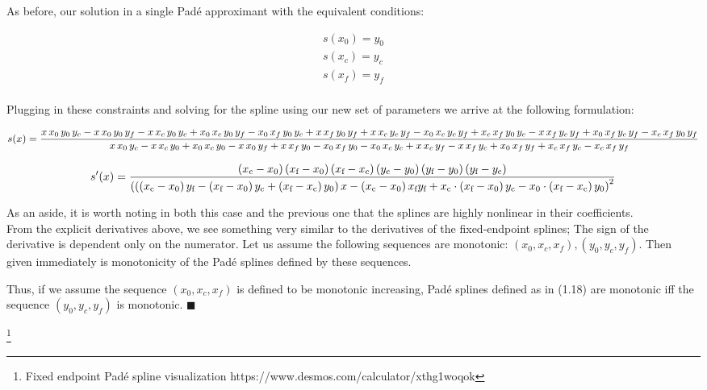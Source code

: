 \documentclass{article}
\begin{document}
		As before, our solution in a single Pad\'{e} approximant with the equivalent conditions: 
	
	\begin{align}
		s(x_0) = y_0 \\
		s(x_c) = y_c \\
		s(x_f) = y_f \\ 
	\end{align}
	
	Plugging in these constraints and solving for the spline using our new set of parameters we arrive at the following formulation:
	
	
	\tiny
	\[
	\hss
	s(x) = \frac{x\,x_{0}\,y_{0}\,y_{c}-x\,x_{0}\,y_{0}\,y_{f}-x\,x_{c}\,y_{0}\,y_{c}+x_{0}\,x_{c}\,y_{0}\,y_{f}-x_{0}\,x_{f}\,y_{0}\,y_{c}+x\,x_{f}\,y_{0}\,y_{f}+x\,x_{c}\,y_{c}\,y_{f}-x_{0}\,x_{c}\,y_{c}\,y_{f}+x_{c}\,x_{f}\,y_{0}\,y_{c}-x\,x_{f}\,y_{c}\,y_{f}+x_{0}\,x_{f}\,y_{c}\,y_{f}-x_{c}\,x_{f}\,y_{0}\,y_{f}}{x\,x_{0}\,y_{c}-x\,x_{c}\,y_{0}+x_{0}\,x_{c}\,y_{0}-x\,x_{0}\,y_{f}+x\,x_{f}\,y_{0}-x_{0}\,x_{f}\,y_{0}-x_{0}\,x_{c}\,y_{c}+x\,x_{c}\,y_{f}-x\,x_{f}\,y_{c}+x_{0}\,x_{f}\,y_{f}+x_{c}\,x_{f}\,y_{c}-x_{c}\,x_{f}\,y_{f}}
	\hss
	\]
	
	\[
	\hss
	s'(x) = \frac{\left(x_\text{c}-x_0\right)\left(x_\text{f}-x_0\right)\left(x_\text{f}-x_\text{c}\right)\left(y_\text{c}-y_0\right)\left(y_\text{f}-y_0\right)\left(y_\text{f}-y_\text{c}\right)}{\left(\left(\left(x_\text{c}-x_0\right)y_\text{f}-\left(x_\text{f}-x_0\right)y_\text{c}+\left(x_\text{f}-x_\text{c}\right)y_0\right)x-\left(x_\text{c}-x_0\right)x_\text{f}y_\text{f}+x_\text{c}\cdot\left(x_\text{f}-x_0\right)y_\text{c}-x_0\cdot\left(x_\text{f}-x_\text{c}\right)y_0\right)^2}
	\hss
	\]

	
	\normalsize 
	
	As an aside, it is worth noting in both this case and the previous one that the splines are highly nonlinear in their coefficients.\\
	From the explicit derivatives above, we see something very similar to the derivatives of the fixed-endpoint splines; The sign of the derivative is dependent only on the numerator. Let us assume the following sequences are monotonic: $(x_0, x_c, x_f), (y_0, y_c, y_f)$. Then given immediately is monotonicity of the Pad\'{e} splines defined by these sequences.
	
	Thus, if we assume the sequence $(x_0, x_c, x_f)$ is defined to be monotonic increasing, Pad\'{e} splines defined as in (1.18) are monotonic iff the sequence $(y_0, y_c, y_f)$ is monotonic. $\blacksquare$
	
	\footnote{ Fixed endpoint Pad\'{e} spline visualization {https://www.desmos.com/calculator/xthg1woqok}}
\end{document}
